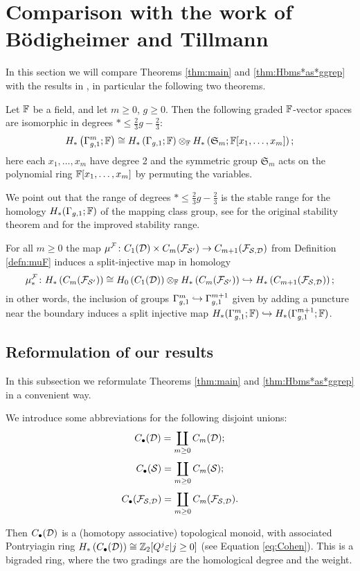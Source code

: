 \section{Comparison with the work of B\"{o}digheimer and Tillmann}
\label{sec:comparison}
In this section we will compare Theorems \ref{thm:main} and \ref{thm:Hbms*as*ggrep}
with the results in \cite{BoT}, in particular the following two theorems.
\begin{thm}
Let $\F$ be a field, and let $m\geq 0$, $g\geq 0$. Then the following graded $\F$-vector spaces are isomorphic in degrees $*\leq \frac 23 g-\frac 23$:
\[
 H_*\pa{\ggm;\F}\cong H_*\pa{\gg;\F}\otimes_{\F} H_*\pa{\mathfrak{S}_m;\F[x_1,\dots,x_m]};
\]
here each $x_1,\dots,x_m$ have degree 2 and the symmetric group $\mathfrak{S}_m$ acts on the polynomial
ring $\F[x_1,\dots,x_m]$ by permuting the variables.
\end{thm}
We point out that the range of degrees $*\leq \frac 23 g-\frac 23$ is the stable range for the homology $H_*(\gg;\F)$
of the mapping class group, see \cite{Harer} for the original stability theorem and \cite{Boldsen, ORW:resolutions_homstab} for the improved
stability range.
\begin{thm}
For all $m\geq 0$ the map $\mu^{\cF}\colon C_1(\D)\times C_m(\cF_{\S'})\to C_{m+1}(\cF_{\S,\D})$ from Definition \ref{defn:muF}
induces a split-injective map in homology
\[
 \mu^{\cF}_*\colon H_*\pa{C_m(\cF_{\S'})}\cong H_0\pa{C_1(\D)}\otimes_{\F} H_*\pa{C_m(\cF_{\S'})}\hookrightarrow H_*\pa{C_{m+1}(\cF_{\S,\D})};
\]
in other words, the inclusion of groups $\ggm\hookrightarrow\gg^{m+1}$ given by adding a puncture near the boundary induces a split
injective map $H_*(\ggm;\F)\hookrightarrow H_*(\gg^{m+1};\F)$.
\end{thm}
\subsection{Reformulation of our results}
\label{subsec:reformulation}
In this subsection we reformulate Theorems \ref{thm:main} and \ref{thm:Hbms*as*ggrep} in a convenient way.
\begin{defn}
 \label{defn:Cbullet}
 We introduce some abbreviations for the following disjoint unions:
 \[
 C_{\bullet}(\D)=\coprod_{m\geq 0}C_m(\D);
 \]
 \[
 C_{\bullet}(\S)=\coprod_{m\geq 0}C_m(\S); 
 \]
 \[
 C_{\bullet}(\cF_{\S,\D})=\coprod_{m\geq 0}C_m(\cF_{\S,\D}).
 \]
\end{defn}
Then $C_{\bullet}(\D)$ is a (homotopy associative) topological monoid, with associated
Pontryiagin ring $H_*\pa{C_{\bullet}(\D)}\cong\Z_2[Q^j\epsilon|j\geq 0]$ (see Equation \ref{eq:Cohen}).
This is a bigraded ring, where the two gradings are the homological degree and the weight.


